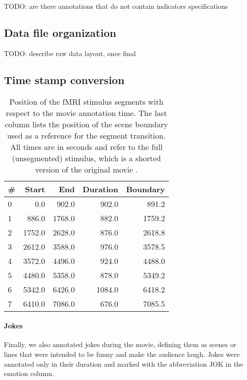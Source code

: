 TODO: are there annotations that do not contain indicators specifications

\subsection*{Data file organization}

TODO: describe raw data layout, once final

\subsection*{Time stamp conversion}

\begin{table}
  \centering
  \begin{tabular}{lrrrr}
  \#  & Start  & End    & Duration& Boundary \\
  \hline
   0  & 0.0    & 902.0  & 902.0  & 891.2    \\
   1  & 886.0  & 1768.0 & 882.0  & 1759.2   \\
   2  & 1752.0 & 2628.0 & 876.0  & 2618.8   \\
   3  & 2612.0 & 3588.0 & 976.0  & 3578.5   \\
   4  & 3572.0 & 4496.0 & 924.0  & 4488.0   \\
   5  & 4480.0 & 5358.0 & 878.0  & 5349.2   \\
   6  & 5342.0 & 6426.0 & 1084.0 & 6418.2   \\
   7  & 6410.0 & 7086.0 & 676.0  & 7085.5   \\
  \end{tabular}

  \caption{Position of the fMRI stimulus segments with respect to the movie
    annotation time. The last column lists the position of the scene boundary
    used as a reference for the segment transition. All times are in seconds
    and refer to the full (unsegmented) stimulus, which is a shorted version of
    the original movie \cite{HBI+14}.}

  \label{tab:timing}
\end{table}

\paragraph{Jokes}
Finally, we also annotated jokes during the movie, defining them as scenes or lines that were intended to be funny and make the audience laugh. Jokes were annotated only in their duration and marked with the abbreviation JOK in the emotion column. 


